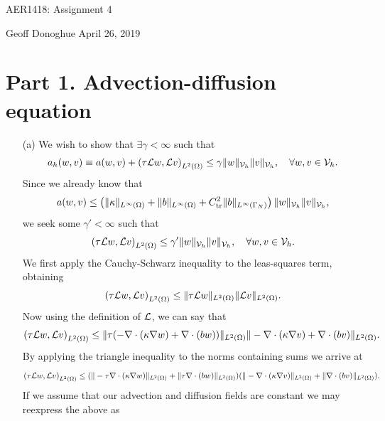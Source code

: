 \documentclass{article}
\begin{document}
\Large\centering AER1418: Assignment 4\\
\normalsize\raggedright Geoff Donoghue \hfill April 26, 2019\\

\section*{Part 1. Advection-diffusion equation}
\begin{itemize}
	\item[(a)] We wish to show that \(\exists\gamma < \infty \) such that
	\begin{equation*}
		a_h(w,v) \equiv a(w,v) + \left(\tau\mathcal{L} w, \mathcal{L} v \right)_{L^2(\Omega)} \leq \gamma\|w\|_{\mathcal{V}_h}\|v\|_{\mathcal{V}_h}, \quad \forall w,v\in \mathcal{V}_h.
	\end{equation*}
	Since we already know that
	\begin{equation*}
		a(w,v) \leq \left(\|\kappa\|_{L^\infty(\Omega)} + \|b\|_{L^\infty(\Omega)} + C^2_\text{tr}\|b\|_{L^\infty(\Gamma_N)} \right)\|w\|_{\mathcal{V}_h}\|v\|_{\mathcal{V}_h},
	\end{equation*}
	we seek some \(\gamma' < \infty \) such that
	\begin{equation*}
		\left(\tau\mathcal{L} w, \mathcal{L} v \right)_{L^2(\Omega)} \leq \gamma'\|w\|_{\mathcal{V}_h}\|v\|_{\mathcal{V}_h}, \quad \forall w,v\in \mathcal{V}_h.
	\end{equation*}
	We first apply the Cauchy-Schwarz inequality to the leas-squares term, obtaining
	\begin{equation*}
		\left(\tau\mathcal{L} w, \mathcal{L} v \right)_{L^2(\Omega)} \leq \|\tau\mathcal{L} w\|_{L^2(\Omega)}\|\mathcal{L} v\|_{L^2(\Omega)}.
	\end{equation*}
	Now using the definition of \(\mathcal{L} \), we can say that
	\begin{equation*}
		\left(\tau\mathcal{L} w, \mathcal{L} v \right)_{L^2(\Omega)} \leq \|\tau(-\nabla\cdot(\kappa\nabla w) + \nabla\cdot(bw))\|_{L^2(\Omega)}\|-\nabla\cdot(\kappa\nabla v) + \nabla\cdot(bv)\|_{L^2(\Omega)}.
	\end{equation*}
	By applying the triangle inequality to the norms containing sums we arrive at
	\begin{equation*}
		\left(\tau\mathcal{L} w, \mathcal{L} v \right)_{L^2(\Omega)} \leq (\|-\tau\nabla\cdot(\kappa\nabla w)\|_{L^2(\Omega)} + \|\tau\nabla\cdot(bw)\|_{L^2(\Omega)})(\|-\nabla\cdot(\kappa\nabla v)\|_{L^2(\Omega)} + \|\nabla\cdot(bv)\|_{L^2(\Omega)}).
	\end{equation*}
	If we assume that our advection and diffusion fields are constant we may reexpress the above as

\end{itemize}
\end{document}
